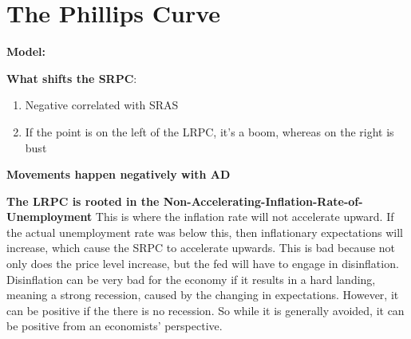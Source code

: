 \documentclass{article}
\begin{document}
\begin{enumerate}
\begin{enumerate}
\begin{enumerate}
\begin{enumerate}
\end{enumerate}
\newpage










\section{The Phillips Curve}
\textbf{Model:}
\begin{center}
\end{center}

\textbf{What shifts the SRPC}:
\begin{enumerate}
    \item Negative correlated with SRAS
    \item If the point is on the left of the LRPC, it's a boom, whereas on the right is bust


\end{enumerate}
\textbf{Movements happen negatively with AD}


\textbf{The LRPC is rooted in the Non-Accelerating-Inflation-Rate-of-Unemployment}
    This is where the inflation rate will not accelerate upward. If the actual unemployment rate was below this, then inflationary expectations will increase, which cause the SRPC to accelerate upwards. This is bad because not only does the price level increase, but the fed will have to engage in disinflation. Disinflation can be very bad for the economy if it results in a hard landing, meaning a strong recession, caused by the changing in expectations. However, it can be positive if the there is no recession. So while it is generally avoided, it can be positive from an economists' perspective.
\newpage







\end{enumerate}
\end{enumerate}
\end{enumerate}
\end{document}
